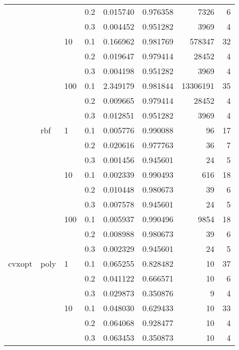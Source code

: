 \begin{table}[H]
\begin{tabular}{llllrrrr}
       &     &     & 0.2 &     0.015740 &  0.976358 &      7326 &     6 \\
       &     &     & 0.3 &     0.004452 &  0.951282 &      3969 &     4 \\
       &     & 10  & 0.1 &     0.166962 &  0.981769 &    578347 &    32 \\
       &     &     & 0.2 &     0.019647 &  0.979414 &     28452 &     4 \\
       &     &     & 0.3 &     0.004198 &  0.951282 &      3969 &     4 \\
       &     & 100 & 0.1 &     2.349179 &  0.981844 &  13306191 &    35 \\
       &     &     & 0.2 &     0.009665 &  0.979414 &     28452 &     4 \\
       &     &     & 0.3 &     0.012851 &  0.951282 &      3969 &     4 \\
       & rbf & 1   & 0.1 &     0.005776 &  0.990088 &        96 &    17 \\
       &     &     & 0.2 &     0.020616 &  0.977763 &        36 &     7 \\
       &     &     & 0.3 &     0.001456 &  0.945601 &        24 &     5 \\
       &     & 10  & 0.1 &     0.002339 &  0.990493 &       616 &    18 \\
       &     &     & 0.2 &     0.010448 &  0.980673 &        39 &     6 \\
       &     &     & 0.3 &     0.007578 &  0.945601 &        24 &     5 \\
       &     & 100 & 0.1 &     0.005937 &  0.990496 &      9854 &    18 \\
       &     &     & 0.2 &     0.008988 &  0.980673 &        39 &     6 \\
       &     &     & 0.3 &     0.002329 &  0.945601 &        24 &     5 \\
cvxopt & poly & 1   & 0.1 &     0.065255 &  0.828482 &        10 &    37 \\
       &     &     & 0.2 &     0.041122 &  0.666571 &        10 &     6 \\
       &     &     & 0.3 &     0.029873 &  0.350876 &         9 &     4 \\
       &     & 10  & 0.1 &     0.048030 &  0.629433 &        10 &    33 \\
       &     &     & 0.2 &     0.064068 &  0.928477 &        10 &     4 \\
       &     &     & 0.3 &     0.063453 &  0.350873 &        10 &     4 \\

\end{tabular}
\end{table}
